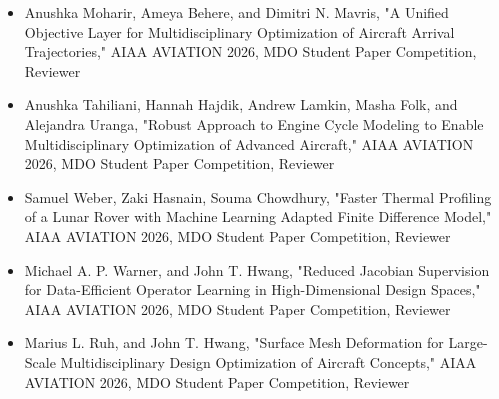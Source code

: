 
\begin{itemize}
    \item Anushka Moharir, Ameya Behere, and Dimitri N. Mavris, "A Unified Objective Layer for Multidisciplinary Optimization of Aircraft Arrival Trajectories," AIAA AVIATION 2026, MDO Student Paper Competition, Reviewer
    \item Anushka Tahiliani, Hannah Hajdik, Andrew Lamkin, Masha Folk, and Alejandra Uranga, "Robust Approach to Engine Cycle Modeling to Enable Multidisciplinary Optimization of Advanced Aircraft," AIAA AVIATION 2026, MDO Student Paper Competition, Reviewer
    \item Samuel Weber, Zaki Hasnain, Souma Chowdhury, "Faster Thermal Profiling of a Lunar Rover with Machine Learning Adapted Finite Difference Model," AIAA AVIATION 2026, MDO Student Paper Competition, Reviewer
    \item Michael A. P. Warner, and John T. Hwang, "Reduced Jacobian Supervision for Data-Efficient Operator Learning in High-Dimensional Design Spaces," AIAA AVIATION 2026, MDO Student Paper Competition, Reviewer
    \item Marius L. Ruh, and John T. Hwang, "Surface Mesh Deformation for Large-Scale Multidisciplinary Design Optimization of Aircraft Concepts," AIAA AVIATION 2026, MDO Student Paper Competition, Reviewer

\end{itemize}
    

